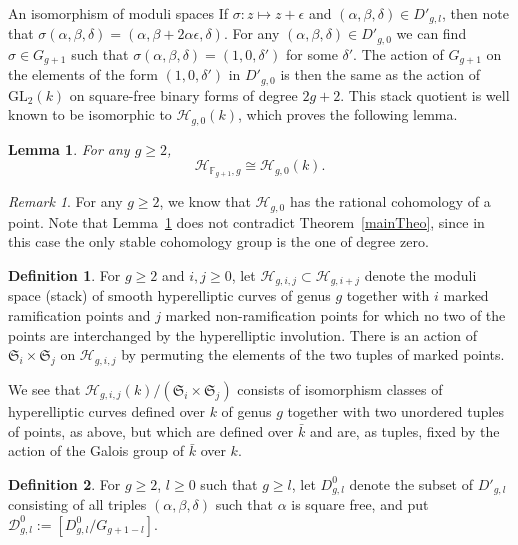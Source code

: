\documentclass[10pt,a4paper,twoside]{amsart}
\theoremstyle{plain}
\newtheorem{lem}[theo]{Lemma}
\theoremstyle{definition}
\newtheorem{defin}{Definition}
\theoremstyle{remark}
\newtheorem{rk}{Remark}[section]
\begin{document}
\begin{subsection}{An isomorphism of moduli spaces}
If $\sigma: z \mapsto z+\epsilon$ and $(\alpha,\beta,\delta) \in D'_{g,l}$, then note that $\sigma(\alpha,\beta,\delta)=(\alpha,\beta+2\alpha \epsilon,\delta)$.
For any $(\alpha,\beta,\delta) \in D'_{g,0}$ we can find $\sigma \in G_{g+1}$ such that  $\sigma(\alpha,\beta,\delta)=(1,0,\delta')$ for some $\delta'$. The action of $G_{g+1}$ on the elements of the form $(1,0,\delta')$ in $D'_{g,0}$ is then the same as the action of $\mathrm{GL}_2(k)$ on square-free binary forms of degree $2g+2$. This stack quotient is well known to be isomorphic to $\mathcal H_{g,0}(k)$, which proves the following lemma. 

\begin{lem} \label{lem-Hg} For any $g \geq 2$, 
\[
\mathcal{H}_{\mathbb{F}_{g+1},g} \cong \mathcal H_{g,0}(k).
\]
\end{lem}

\begin{rk} For any $g \geq 2$, we know that $\mathcal{H}_{g,0}$ has the rational cohomology of a point. Note that Lemma~\ref{lem-Hg} does not contradict Theorem~\ref{mainTheo}, since in this case the only stable cohomology group is the one of degree zero.
\end{rk}

\begin{defin} \label{def-2} 
For $g \geq 2$ and $i,j \geq 0$, let $\mathcal H_{g,i,j} \subset \mathcal H_{g,i+j}$ denote the moduli space (stack) of smooth hyperelliptic curves of genus $g$ together with $i$ marked ramification points and $j$ marked non-ramification points for which no two of the points are interchanged by the hyperelliptic involution. There is an action of $\mathfrak{S}_i \times \mathfrak{S}_j$ on $\mathcal H_{g,i,j}$ by permuting the elements of the two tuples of marked points.
\end{defin}

 We see that $\mathcal H_{g,i,j}(k)/(\mathfrak{S}_i \times \mathfrak{S}_j)$ consists of isomorphism classes of hyperelliptic curves defined over $k$ of genus $g$ together with two unordered tuples of points, as above, but which are defined over $\bar k$ and are, as tuples, fixed by the action of the Galois group of $\bar k$ over $k$. 

\begin{defin} For $g \geq 2$, $l \geq 0$ such that $g \geq l$, let $D^0_{g,l}$ denote the subset of $D'_{g,l}$ consisting of all triples $(\alpha,\beta,\delta)$ such that $\alpha$ is square free, and put $\mathcal{D}^0_{g,l}:=[D^0_{g,l}/G_{g+1-l}]$. 
\end{defin}


\end{subsection}
\end{document}
